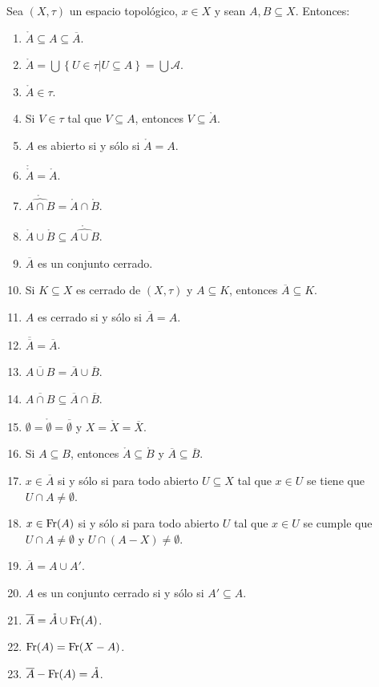 \documentclass[12pt]{report}
\theoremstyle{largebreak}
\newcommand{\Int}[1]{\ensuremath{\mathring{#1}}}
\newcommand{\Cls}[1]{\ensuremath{\overline{#1}}}
\newcommand{\Fr}[1]{\ensuremath{\textup{Fr}(#1)}}
\begin{document}
    \begin{propo}
        Sea $(X,\tau)$ un espacio topológico, $x\in X$ y sean $A,B\subseteq X$. Entonces:
        \begin{enumerate}
            \item $\Int{A}\subseteq A\subseteq\Cls{A}$.
            \item $\Int{A}=\bigcup\left\{U\in\tau\big|U\subseteq A \right\}=\bigcup\mathcal{A}$.
            \item $\Int{A}\in\tau$.
            \item Si $V\in\tau$ tal que $V\subseteq A$, entonces $V\subseteq\Int{A}$.
            \item $A$ es abierto si y sólo si $\Int{A}=A$.
            \item $\Int{\Int{A}}=\Int{A}$.
            \item $\Int{\widehat{A\cap B}}=\Int{A}\cap\Int{B}$.
            \item $\Int{A}\cup\Int{B}\subseteq \Int{\widehat{A\cup B}}$.
            \item $\Cls{A}$ es un conjunto cerrado.
            \item Si $K\subseteq X$ es cerrado de $(X,\tau)$ y $A\subseteq K$, entonces $\Cls{A}\subseteq K$.
            \item $A$ es cerrado si y sólo si $\Cls{A}=A$.
            \item $\Cls{\Cls{A}}=\Cls{A}$.
            \item $\Cls{A\cup B}=\Cls{A}\cup\Cls{B}$.
            \item $\Cls{A\cap B}\subseteq\Cls{A}\cap\Cls{B}$.
            \item $\emptyset=\Int{\emptyset}=\Cls{\emptyset}$ y $X=\Int{X}=\Cls{X}$.
            \item Si $A\subseteq B$, entonces $\Int{A}\subseteq \Int{B}$ y $\Cls{A}\subseteq\Cls{B}$.
            \item $x\in\Cls{A}$ si y sólo si para todo abierto $U\subseteq X$ tal que $x\in U$ se tiene que $U\cap A\neq\emptyset$.
            \item $x\in\Fr{A}$ si y sólo si para todo abierto $U$ tal que $x\in U$ se cumple que $U\cap A\neq\emptyset$ y $U\cap (A-X)\neq\emptyset$.
            \item $\Cls{A}=A\cup A'$.
            \item $A$ es un conjunto cerrado si y sólo si $A'\subseteq A$.
            \item $\Cls{A}=\Int{A}\cup\Fr{A}$.
            \item $\Fr{A}=\Fr{X-A}$.
            \item $\Cls{A}-\Fr{A}=\Int{A}$.
        \end{enumerate}
    \end{propo}
\end{document}
